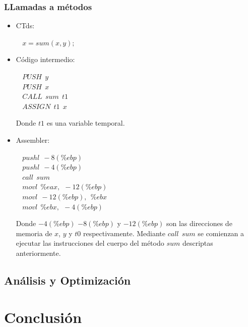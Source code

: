 \documentclass[11pt,a4paper]{article}
\begin{document}
\subsubsection{LLamadas a métodos}
\begin{itemize}
	\item CTds:
		\begin{flushleft}
			$\ \ \ \ x = sum(x,y);$
		\end{flushleft}
	\item Código intermedio:
		\begin{flushleft}
			$\ \ \ \ PUSH \ \ y$ \\
			$\ \ \ \ PUSH \ \ x$ \\			
			$\ \ \ \ CALL \ \ sum \ \ t1$ \\
			$\ \ \ \ ASSIGN \ \ t1 \ \ x$
		\end{flushleft}
		Donde $t1$ es una variable temporal.
	\item Assembler:
		\begin{flushleft}
			$\ \ \ \ pushl \ \ -8(\%ebp)$ \\
			$\ \ \ \ pushl \ \ -4(\%ebp)$ \\
			$\ \ \ \ call \ \ sum$ \\
			$\ \ \ \ movl \ \ \%eax, \ \ -12(\%ebp)$ \\
			$\ \ \ \ movl \ \ -12(\%ebp), \ \ \%ebx$ \\ 
			$\ \ \ \ movl \ \ \%ebx, \ \ -4(\%ebp)$	
		\end{flushleft}
		Donde $-4(\%ebp)$  $-8(\%ebp)$ y $-12(\%ebp)$ son las direcciones de memoria de $x$, $y$ y $t0$ respectivamente. Mediante $call \ \ sum$ se comienzan a ejecutar las instrucciones del cuerpo del método $sum$ descriptas anteriormente.
\end{itemize}

\subsection{Análisis y Optimización} 
\label{subsec:opt}

\section{Conclusión} 
\label{sec:concl}
\end{document}
